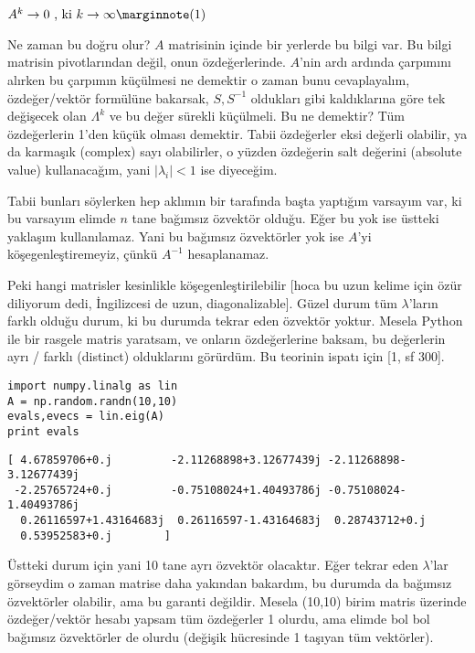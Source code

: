 \documentclass[12pt,fleqn]{article}\usepackage{../../common}
\begin{document}
$
A^k \to 0 \textrm{ , ki } k \to \infty  
\mlabel{1}
$ 

Ne zaman bu doğru olur? $A$ matrisinin içinde bir yerlerde bu bilgi var. Bu
bilgi matrisin pivotlarından değil, onun özdeğerlerinde. $A$'nin ardı
ardında çarpımını alırken bu çarpımın küçülmesi ne demektir o zaman bunu
cevaplayalım, özdeğer/vektör formülüne bakarsak, $S,S^{-1}$ oldukları gibi
kaldıklarına göre tek değişecek olan $\Lambda^k$ ve bu değer sürekli
küçülmeli. Bu ne demektir? Tüm özdeğerlerin 1'den küçük olması
demektir. Tabii özdeğerler eksi değerli olabilir, ya da karmaşık (complex)
sayı olabilirler, o yüzden özdeğerin salt değerini (absolute value)
kullanacağım, yani $|\lambda_i| < 1$ ise diyeceğim. 

Tabii bunları söylerken hep aklımın bir tarafında başta yaptığım varsayım
var, ki bu varsayım elimde $n$ tane bağımsız özvektör olduğu. Eğer bu yok
ise üstteki yaklaşım kullanılamaz. Yani bu bağımsız özvektörler yok ise
$A$'yi köşegenleştiremeyiz, çünkü $A^{-1}$ hesaplanamaz.

Peki hangi matrisler kesinlikle köşegenleştirilebilir [hoca bu uzun kelime
için özür diliyorum dedi, İngilizcesi de uzun, diagonalizable]. Güzel durum
tüm $\lambda$'ların farklı olduğu durum, ki bu durumda tekrar eden özvektör
yoktur. Mesela Python ile bir rasgele matris yaratsam, ve onların
özdeğerlerine baksam, bu değerlerin ayrı / farklı (distinct) olduklarını
görürdüm. Bu teorinin ispatı için [1, sf 300]. 

\begin{verbatim}
import numpy.linalg as lin
A = np.random.randn(10,10)
evals,evecs = lin.eig(A)
print evals
\end{verbatim}

\begin{verbatim}
[ 4.67859706+0.j         -2.11268898+3.12677439j -2.11268898-3.12677439j
 -2.25765724+0.j         -0.75108024+1.40493786j -0.75108024-1.40493786j
  0.26116597+1.43164683j  0.26116597-1.43164683j  0.28743712+0.j
  0.53952583+0.j        ]
\end{verbatim}

Üstteki durum için yani 10 tane ayrı özvektör olacaktır. Eğer tekrar eden
$\lambda$'lar görseydim o zaman matrise daha yakından bakardım, bu durumda
da bağımsız özvektörler olabilir, ama bu garanti değildir. Mesela (10,10)
birim matris üzerinde özdeğer/vektör hesabı yapsam tüm özdeğerler 1 olurdu,
ama elimde bol bol bağımsız özvektörler de olurdu (değişik hücresinde 1
taşıyan tüm vektörler).
\end{document}
